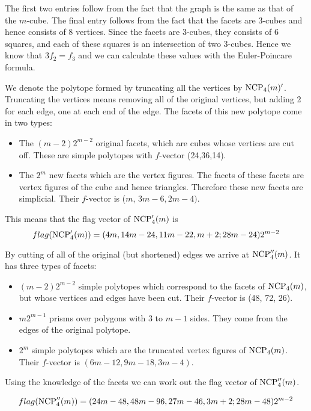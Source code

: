 The first two entries follow from the fact that the graph is the same as that 
of the $m$-cube. The final entry follows from the fact that the facets are 
3-cubes and hence consists of 8 vertices. Since the facets are 3-cubes, they 
consists of 6 squares, and each of these squares is an intersection of two 
3-cubes. Hence we know that $3f_2 = f_3$ and we can calculate these values with 
the Euler-Poincare formula.

We denote the polytope formed by truncating all the vertices by $\textrm{NCP}_4(m)'$.
Truncating the vertices means removing all of the original vertices, but 
adding 2 for each edge, one at each end of the edge. The facets of this new 
polytope come in two types:

\begin{itemize}
 \item The $(m-2)2^{m-2}$ original facets, which are cubes whose vertices are 
cut off. These are simple polytopes with $f$-vector (24,36,14).
 \item The $2^m$ new facets which are the vertex figures. The facets of these 
facets are vertex figures of the cube and hence triangles. Therefore these 
new facets are simplicial. Their $f$-vector is ($m$, 
$3m-6, 2m-4)$.
\end{itemize}

This means that the flag vector of $\textrm{NCP}'_4(m)$ is 
\begin{equation}
 flag(\textrm{NCP}'_4(m)) = (4m, 14m-24, 11m-22, m+2; 28m-24)2^{m-2}
\end{equation}

By cutting of all of the original (but shortened) edges we arrive at 
$\textrm{NCP}''_4(m)$. It has three types of facets:

\begin{itemize}
 \item $(m-2)2^{m-2}$ simple polytopes which correspond to the facets of 
$\textrm{NCP}_4(m)$, but whose vertices and edges have been cut. Their $f$-vector is 
(48, 72, 26).
\item $m2^{m-1}$ prisms over polygons with $3$ to $m-1$ sides. They come from 
the edges of the original polytope.
\item $2^m$ simple polytopes which are the truncated vertex figures of 
$\textrm{NCP}_4(m)$. Their $f$-vector is $(6m - 12, 9m-18, 3m-4)$.
\end{itemize}

Using the knowledge of the facets we can work out the flag vector of 
$\textrm{NCP}''_4(m)$.

\begin{equation}
 flag(\textrm{NCP}''_4(m)) = (24m-48, 48m-96, 27m - 46, 3m+2; 28m -48)2^{m-2}
\end{equation}

